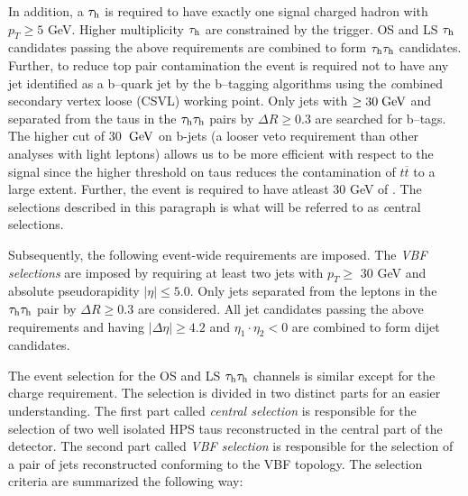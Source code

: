 In addition, a $\tau_{\text{h}}$ is required to have exactly one signal charged hadron with $p_{T} \ge 5$ GeV. Higher multiplicity $\tau_{\text{h}}$ are constrained by the trigger. OS and LS $\tau_{\text{h}}$ candidates passing the above requirements are combined to form $\tau_{\text{h}}\tau_{\text{h}}$ candidates. Further, to reduce top pair contamination the event is required not to have any jet identified as a b--quark jet by the b--tagging algorithms using the {\textit combined secondary vertex loose} (CSVL) working point. Only jets with \pt $\ge 30 \;\text{Ge}\kern-0.06667em\text{V}$ and separated from the taus in the $\tau_{\text{h}}\tau_{\text{h}}$ pairs by $\Delta R \ge 0.3$ are searched for b--tags. The higher \pt cut of 30 $\;\text{Ge}\kern-0.06667em\text{V}$ on b-jets (a looser veto requirement than other analyses with light leptons) allows us to be more efficient with respect to the signal since the higher \pt threshold on taus reduces the contamination of $t\overline{t}$ to a large extent. Further, the event is required to have atleast 30 GeV of  \met. The selections described in this paragraph is what will be referred to as {\textit central selections}.

Subsequently, the following event-wide requirements are imposed. The {\textit {VBF selections}} are imposed by requiring at least two jets with $p_{T} \ge$  30 GeV and absolute pseudorapidity $|\eta| \le 5.0$. Only jets separated from the leptons in the $\tau_{\text{h}}\tau_{\text{h}}$ pair by $\Delta R \ge 0.3$ are considered. All jet candidates passing the above requirements and having $\vert \Delta\eta \vert \ge 4.2$ and $\eta_{1}\cdot\eta_{2} < 0$ are combined to form dijet candidates.

The event selection for the OS and LS $\tau_{\text{h}}\tau_{\text{h}}$ channels is similar except for the charge requirement. The selection is divided in two distinct parts for an easier understanding. The first part called \textit{central selection} is responsible for the selection of two well isolated HPS taus reconstructed in the central part of the detector. The second part called \textit{VBF selection} is responsible for the selection of a pair of jets reconstructed conforming to the VBF topology. The selection criteria are summarized the following way:

